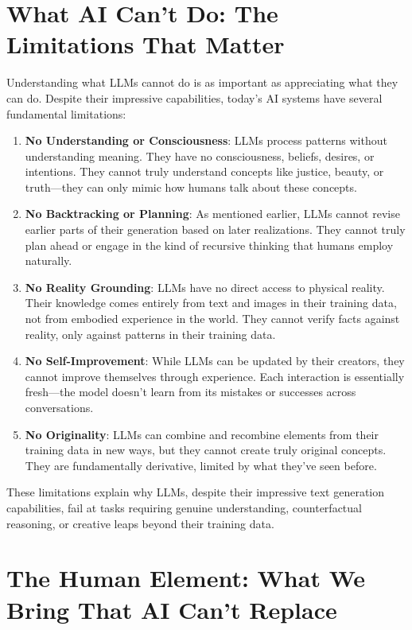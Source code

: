 \documentclass[
  Letterpaper,
]{scrbook}
\begin{document}
\section{What AI Can't Do: The Limitations That
Matter}\label{what-ai-cant-do-the-limitations-that-matter}

Understanding what LLMs cannot do is as important as appreciating what
they can do. Despite their impressive capabilities, today's AI systems
have several fundamental limitations:

\begin{enumerate}
\def\labelenumi{\arabic{enumi}.}
\item
  \textbf{No Understanding or Consciousness}: LLMs process patterns
  without understanding meaning. They have no consciousness, beliefs,
  desires, or intentions. They cannot truly understand concepts like
  justice, beauty, or truth---they can only mimic how humans talk about
  these concepts.
\item
  \textbf{No Backtracking or Planning}:
  As mentioned earlier, LLMs cannot revise earlier parts of their
  generation based on later realizations. They cannot truly plan ahead
  or engage in the kind of recursive thinking that humans employ
  naturally.
\item
  \textbf{No Reality Grounding}: LLMs have no direct access to physical
  reality. Their knowledge comes entirely from text and images in their
  training data, not from embodied experience in the world. They cannot
  verify facts against reality, only against patterns in their training
  data.
\item
  \textbf{No Self-Improvement}: While LLMs can be updated by their
  creators, they cannot improve themselves through experience. Each
  interaction is essentially fresh---the model doesn't learn from its
  mistakes or successes across conversations.
\item
  \textbf{No Originality}: LLMs can combine and recombine elements from
  their training data in new ways, but they cannot create truly original
  concepts. They are fundamentally derivative, limited by what they've
  seen before.
\end{enumerate}

These limitations explain why LLMs, despite their impressive text
generation capabilities, fail at tasks requiring genuine understanding,
counterfactual reasoning, or creative leaps beyond their training data.

\section{The Human Element: What We Bring That AI Can't
Replace}\label{the-human-element-what-we-bring-that-ai-cant-replace}
\end{document}
